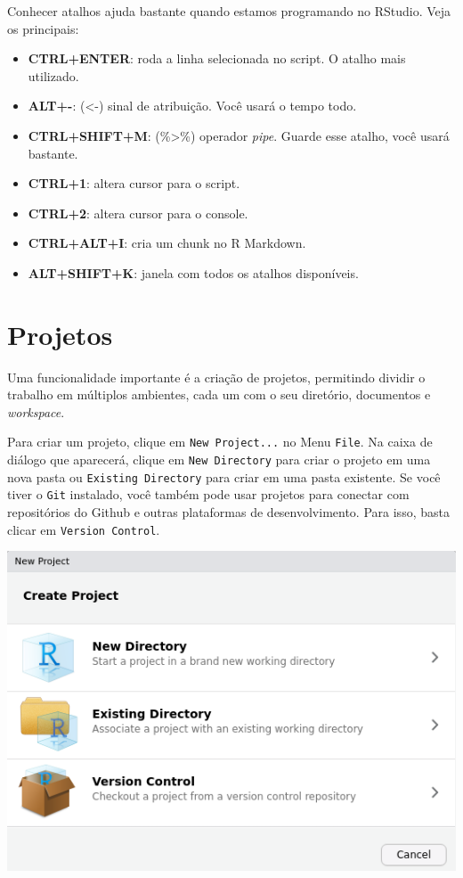 \documentclass[
]{book}
\providecommand{\tightlist}{%
  \setlength{\itemsep}{0pt}\setlength{\parskip}{0pt}}
\begin{document}
Conhecer atalhos ajuda bastante quando estamos programando no RStudio. Veja os principais:

\begin{itemize}
\tightlist
\item
  \textbf{CTRL+ENTER}: roda a linha selecionada no script. O atalho mais utilizado.
\item
  \textbf{ALT+-}: (\textless-) sinal de atribuição. Você usará o tempo todo.
\item
  \textbf{CTRL+SHIFT+M}: (\%\textgreater\%) operador \emph{pipe}. Guarde esse atalho, você usará bastante.
\item
  \textbf{CTRL+1}: altera cursor para o script.
\item
  \textbf{CTRL+2}: altera cursor para o console.
\item
  \textbf{CTRL+ALT+I}: cria um chunk no R Markdown.
\item
  \textbf{ALT+SHIFT+K}: janela com todos os atalhos disponíveis.
\end{itemize}

\hypertarget{projetos}{%
\section{Projetos}\label{projetos}}

Uma funcionalidade importante é a criação de projetos, permitindo dividir o trabalho em múltiplos ambientes, cada um com o seu diretório, documentos e \emph{workspace}.

Para criar um projeto, clique em \texttt{New\ Project...} no Menu \texttt{File}. Na caixa de diálogo que aparecerá, clique em \texttt{New\ Directory} para criar o projeto em uma nova pasta ou \texttt{Existing\ Directory} para criar em uma pasta existente. Se você tiver o \texttt{Git} instalado, você também pode usar projetos para conectar com repositórios do Github e outras plataformas de desenvolvimento. Para isso, basta clicar em \texttt{Version\ Control}.

\begin{center}\includegraphics[width=7.4in]{img/rstudio/projetos} \end{center}
\end{document}
